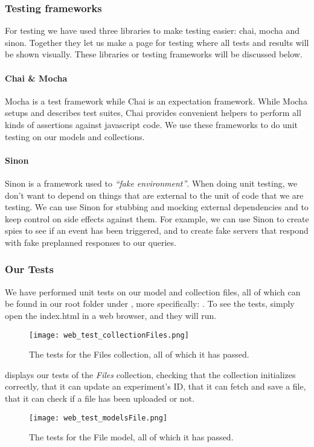 \subsubsection{Testing frameworks}
For testing we have used three libraries to make testing easier: chai, mocha and sinon. Together they let us make a page for testing where all tests and results will be shown visually.
These libraries or testing frameworks will be discussed below.

\paragraph{Chai \& Mocha}
Mocha\cite{web_8} is a test framework while Chai\cite{web_7} is an expectation framework. While Mocha setups and describes test suites, Chai provides convenient helpers to perform all kinds of assertions against javascript code. We use these frameworks to do unit testing on our models and collections.

\paragraph{Sinon}
Sinon\cite{web_9} is a framework used to \textit{“fake environment”}. When doing unit testing, we don’t want to depend on things that are external to the unit of code that we are testing. We can use Sinon for stubbing and mocking external dependencies and to keep control on side effects against them. For example, we can use Sinon to create spies to see if an event has been triggered, and to create fake servers that respond with fake preplanned responses to our queries.

\subsubsection{Our Tests}
We have performed unit tests on our model and collection files, all of which can be found in our root folder under , more specifically: . To see the tests, simply open the index.html in a web browser, and they will run.

\begin{figure}[h]
\centering
\texttt{[image: web\_test\_collectionFiles.png]}
\caption{The tests for the Files collection, all of which it has passed.}
\label{fig:web_test_collectionFiles}
\end{figure}

 displays our tests of the \textit{Files} collection, checking that the collection initializes correctly, that it can update an experiment’s ID, that it can fetch and save a file, that it can check if a file has been uploaded or not.
\begin{figure}[h]
\centering
\texttt{[image: web\_test\_modelsFile.png]}
\caption{The tests for the File model, all of which it has passed.}
\label{fig:web_test_modelsFile}
\end{figure}

